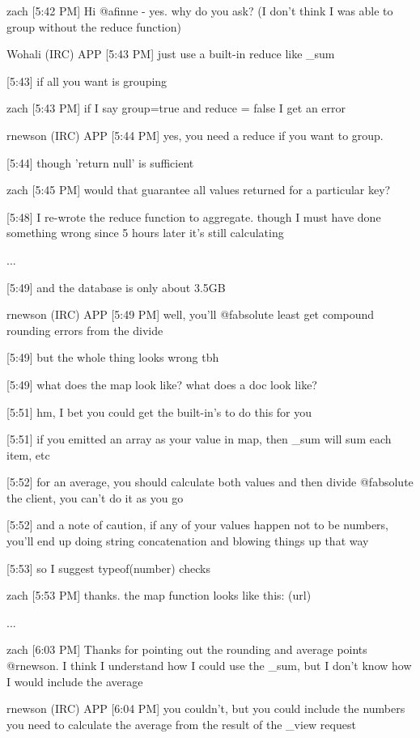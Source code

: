 zach [5:42 PM]
Hi @afinne - yes. why do you ask? (I don't think I was able to group without the reduce function)

Wohali (IRC) APP [5:43 PM]
just use a built-in reduce like \_sum

[5:43]
if all you want is grouping

zach [5:43 PM]
if I say group=true and reduce = false I get an error

rnewson (IRC) APP [5:44 PM]
yes, you need a reduce if you want to group.

[5:44]
though 'return null' is sufficient

zach [5:45 PM]
would that guarantee all values returned for a particular key?

[5:48]
I re-wrote the reduce function to aggregate. though I must have done something wrong since 5 hours later it's still calculating

...

[5:49]
and the database is only about 3.5GB

rnewson (IRC) APP [5:49 PM]
well, you'll @fabsolute least get compound rounding errors from the divide

    [5:49]
but the whole thing looks wrong tbh

    [5:49]
what does the map look like? what does a doc look like?

[5:51]
hm, I bet you could get the built-in's to do this for you

    [5:51]
if you emitted an array as your value in map, then \_sum will sum each item, etc

    [5:52]
for an average, you should calculate both values and then divide @fabsolute the client, you can't do it as you go

    [5:52]
and a note of caution, if any of your values happen not to be numbers, you'll end up doing string concatenation and blowing things up that way

    [5:53]
so I suggest typeof(number) checks

zach [5:53 PM]
thanks. the map function looks like this: (url)

...

zach [6:03 PM]
Thanks for pointing out the rounding and average points @rnewson. I think I understand how I could use the \_sum, but I don't know how I would include the average

rnewson (IRC) APP [6:04 PM]
you couldn't, but you could include the numbers you need to calculate the average from the result of the \_view request

